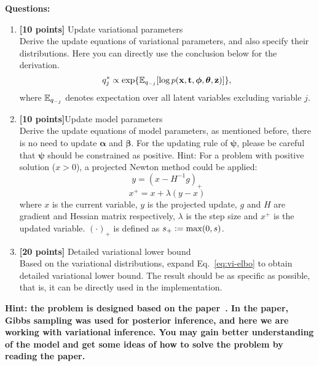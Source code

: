 \documentclass{article}
\newcommand{\alphav     }{\boldsymbol \alpha     }
\newcommand{\betav      }{\boldsymbol \beta      }
\newcommand{\thetav     }{\boldsymbol \theta     }
\newcommand{\phiv       }{\boldsymbol \phi       }
\newcommand{\psiv       }{\boldsymbol \psi       }
\begin{document}
\textbf{Questions:}
\begin{enumerate}
	\item \textbf{[10 points]} Update variational parameters\\
	Derive the update equations of variational parameters, and also specify their distributions. Here you can directly use the conclusion below for the derivation.
	$$q_j^*\propto \exp\{\Eb_{q_{-j}}[\log p(\xv, \tv, \phiv, \thetav, \zv)]\},$$
	where $\mathbb{E}_{q_{-j}}$ denotes expectation over all latent variables excluding variable $j$.
	

	\item \textbf{[10 points]}Update model parameters\\
	Derive the update equations of model parameters, as mentioned before, there is no need to update $\alphav$ and $\betav$. For the updating rule of $\psiv$, please be careful that $\psiv$ should be constrained as positive.
	Hint: For a problem with positive solution ($x> 0$), a projected Newton method could be applied:
	$$y= (x - H^{-1}g)_{+}$$
	$$x^{+} = x + \lambda(y - x)$$ 
	where $x$ is the current variable, $y$ is the projected update, $g$ and $H$ are gradient and Hessian matrix respectively, $\lambda$ is the step size and $x^{+}$ is the updated variable. $(\cdot)_{+}$ is defined as $s_{+} \mathrel{\mathop:}= \max(0, s)$.

	\item \textbf{[20 points]} Detailed variational lower bound\\
	Based on the variational distributions, expand Eq.~\ref{eq:vi-elbo} to obtain detailed variational lower bound. The result should be as specific as possible, that is, it can be directly used in the implementation. 
    
\end{enumerate}


\noindent
\textbf{Hint: the problem is designed based on the paper~\citep{wang2006topics}. In the paper, Gibbs sampling was used for posterior inference, and here we are working with variational inference. You may gain better understanding of the model and get some ideas of how to solve the problem by reading the paper. }\\
\end{document}
